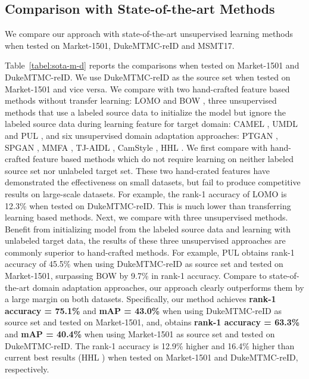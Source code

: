 \documentclass[10pt,twocolumn,letterpaper]{article}
\begin{document}
\subsection{Comparison with State-of-the-art Methods}

We compare our approach with state-of-the-art unsupervised learning methods when tested on Market-1501, DukeMTMC-reID and MSMT17.

Table~\ref{tabel:sota-m-d} reports the comparisons when tested on Market-1501 and DukeMTMC-reID. We use DukeMTMC-reID as the source set when tested on Market-1501 and vice versa. We compare with two hand-crafted feature based methods without transfer learning: LOMO \cite{liao2015lomo} and BOW \cite{zheng2015scalable}, three unsupervised methods that use a labeled source data to initialize the model but ignore the labeled source data during learning feature for target domain: CAMEL \cite{yu2017cross}, UMDL \cite{peng2016unsupervised} and PUL \cite{fan2017pul}, and six unsupervised domain adaptation approaches: PTGAN \cite{wei2018person}, SPGAN \cite{deng2018image}, MMFA \cite{lin2018multibmvc}, TJ-AIDL \cite{wang2018reid}, CamStyle \cite{zhong2019camstyle}, HHL \cite{Zhong_2018_ECCV}. We first compare with hand-crafted feature based methods which do not require learning on neither labeled source set nor unlabeled target set. These two hand-crated features have demonstrated the effectiveness on small datasets, but fail to produce competitive results on large-scale datasets. For example, the rank-1 accuracy of LOMO is 12.3\% when tested on DukeMTMC-reID. This is much lower than transferring learning based methods. Next, we compare with three unsupervised methods. Benefit from initializing model from the labeled source data and learning with unlabeled target data, the results of these three unsupervised approaches are commonly superior to hand-crafted methods. For example, PUL obtains rank-1 accuracy of 45.5\% when using DukeMTMC-reID as source set and tested on Market-1501, surpassing BOW by 9.7\% in rank-1 accuracy. Compare to state-of-the-art domain adaptation approaches, our approach clearly outperforms them by a large margin on both datasets. Specifically, our method achieves \textbf{rank-1 accuracy = 75.1\%} and \textbf{mAP = 43.0\%} when using DukeMTMC-reID as source set and tested on Market-1501, and, obtains \textbf{rank-1 accuracy = 63.3\%} and \textbf{mAP = 40.4\%} when using Market-1501 as source set and tested on DukeMTMC-reID.  The rank-1 accuracy is 12.9\% higher  and 16.4\% higher than current best results (HHL \cite{Zhong_2018_ECCV}) when tested on Market-1501 and DukeMTMC-reID, respectively.
\end{document}

